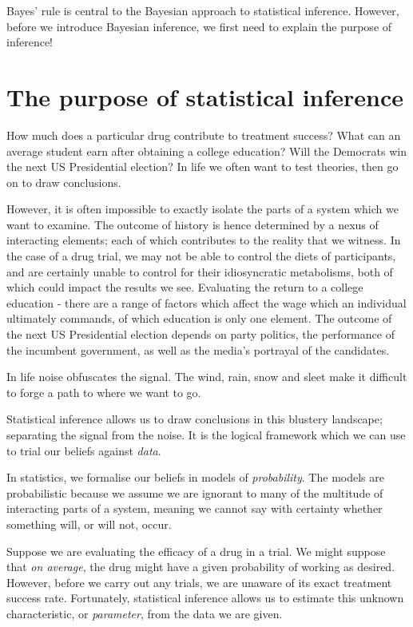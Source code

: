 \documentclass[11pt,fullpage]{book}
\begin{document}
Bayes' rule is central to the Bayesian approach to statistical inference. However, before we introduce Bayesian inference, we first need to explain the purpose of inference!

\section{The purpose of statistical inference}\label{sec:Intro_purposeStatisticalInference}
How much does a particular drug contribute to treatment success? What can an average student earn after obtaining a college education? Will the Democrats win the next US Presidential election? In life we often want to test theories, then go on to draw conclusions.

However, it is often impossible to exactly isolate the parts of a system which we want to examine. The outcome of history is hence determined by a nexus of interacting elements; each of which contributes to the reality that we witness. In the case of a drug trial, we may not be able to control the diets of participants, and are certainly unable to control for their idiosyncratic metabolisms, both of which could impact the results we see. Evaluating the return to a college education - there are a range of factors which affect the wage which an individual ultimately commands, of which education is only one element. The outcome of the next US Presidential election depends on party politics, the performance of the incumbent government, as well as the media's portrayal of the candidates. 

In life noise obfuscates the signal. The wind, rain, snow and sleet make it difficult to forge a path to where we want to go.

Statistical inference allows us to draw conclusions in this blustery landscape; separating the signal from the noise. It is the logical framework which we can use to trial our beliefs against \textit{data}. 

In statistics, we formalise our beliefs in models of \textit{probability}. The models are probabilistic because we assume we are ignorant to many of the multitude of interacting parts of a system, meaning we cannot say with certainty whether something will, or will not, occur.

Suppose we are evaluating the efficacy of a drug in a trial. We might suppose that \textit{on average}, the drug might have a given probability of working as desired. However, before we carry out any trials, we are unaware of its exact treatment success rate. Fortunately, statistical inference allows us to estimate this unknown characteristic, or \textit{parameter}, from the data we are given. 
\end{document}
